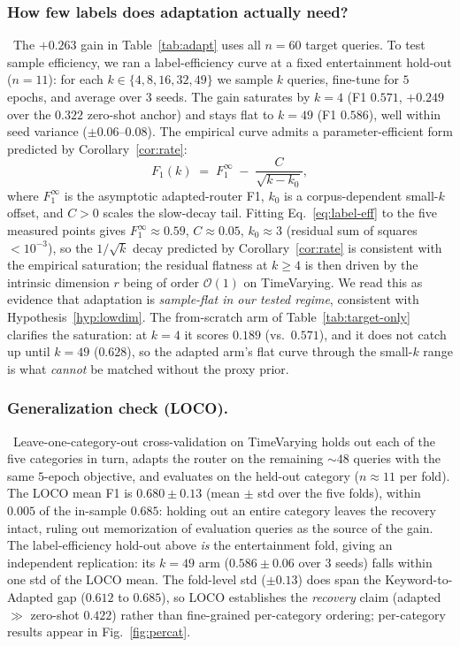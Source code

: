 \documentclass[pdflatex,sn-basic]{sn-jnl}
\begin{document}
\subsubsection*{How few labels does adaptation actually need?}~The $+0.263$ gain in Table~\ref{tab:adapt} uses all $n{=}60$ target queries. To test sample efficiency, we ran a label-efficiency curve at a fixed entertainment hold-out ($n{=}11$): for each $k \in \{4,8,16,32,49\}$ we sample $k$ queries, fine-tune for $5$ epochs, and average over $3$ seeds. The gain saturates by $k{=}4$ (F1 $0.571$, $+0.249$ over the $0.322$ zero-shot anchor) and stays flat to $k{=}49$ (F1 $0.586$), well within seed variance ($\pm 0.06$--$0.08$). The empirical curve admits a parameter-efficient form predicted by Corollary~\ref{cor:rate}:
\begin{equation}
\label{eq:label-eff}
F_1(k) \;=\; F_1^{\infty} \;-\; \frac{C}{\sqrt{k - k_0}},
\end{equation}
where $F_1^{\infty}$ is the asymptotic adapted-router F1, $k_0$ is a corpus-dependent small-$k$ offset, and $C > 0$ scales the slow-decay tail. Fitting Eq.~\ref{eq:label-eff} to the five measured points gives $F_1^{\infty} \approx 0.59$, $C \approx 0.05$, $k_0 \approx 3$ (residual sum of squares $< 10^{-3}$), so the $1/\sqrt{k}$ decay predicted by Corollary~\ref{cor:rate} is consistent with the empirical saturation; the residual flatness at $k \ge 4$ is then driven by the intrinsic dimension $r$ being of order $\mathcal{O}(1)$ on TimeVarying. We read this as evidence that adaptation is \emph{sample-flat in our tested regime}, consistent with Hypothesis~\ref{hyp:lowdim}. The from-scratch arm of Table~\ref{tab:target-only} clarifies the saturation: at $k{=}4$ it scores $0.189$ (vs.\ $0.571$), and it does not catch up until $k{=}49$ ($0.628$), so the adapted arm's flat curve through the small-$k$ range is what \emph{cannot} be matched without the proxy prior.

\subsubsection*{Generalization check (LOCO).}~Leave-one-category-out cross-validation on TimeVarying holds out each of the five categories in turn, adapts the router on the remaining $\sim$$48$ queries with the same $5$-epoch objective, and evaluates on the held-out category ($n{\approx}11$ per fold). The LOCO mean F1 is $0.680 \pm 0.13$ (mean $\pm$ std over the five folds), within $0.005$ of the in-sample $0.685$: holding out an entire category leaves the recovery intact, ruling out memorization of evaluation queries as the source of the gain. The label-efficiency hold-out above \emph{is} the entertainment fold, giving an independent replication: its $k{=}49$ arm ($0.586 \pm 0.06$ over $3$ seeds) falls within one std of the LOCO mean. The fold-level std ($\pm 0.13$) does span the Keyword-to-Adapted gap ($0.612$ to $0.685$), so LOCO establishes the \emph{recovery} claim (adapted $\gg$ zero-shot $0.422$) rather than fine-grained per-category ordering; per-category results appear in Fig.~\ref{fig:percat}.
\end{document}
